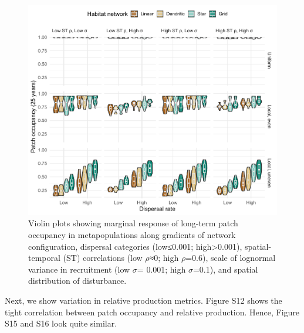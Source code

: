 \documentclass[
]{article}
\begin{document}
\begin{figure}[H]

{\centering \includegraphics{Managing_for_ecological_surprises_in_metapopulations_files/figure-latex/violin plots of risk of patch occupancy-1} 

}

\caption{Violin plots showing marginal response of long-term patch occupancy in metapopulations along gradients of network configuration, dispersal categories (low≤0.001; high>0.001), spatial-temporal (ST) correlations (low $\rho$≈0; high $\rho$=0.6), scale of lognormal variance in recruitment (low $\sigma$= 0.001; high $\sigma$=0.1), and spatial distribution of disturbance.}\label{fig:violin plots of risk of patch occupancy}
\end{figure}

Next, we show variation in relative production metrics. Figure S12 shows
the tight correlation between patch occupancy and relative production.
Hence, Figure S15 and S16 look quite similar.
\end{document}
